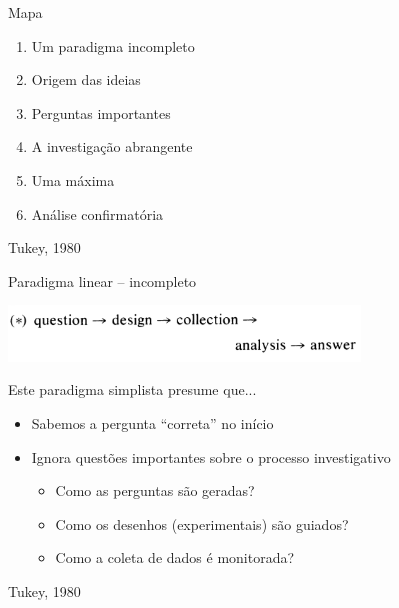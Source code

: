 \documentclass{beamer}
\begin{document}

\begin{frame}{Mapa}
  \begin{enumerate}
    \scriptsize
  \item Um paradigma incompleto
    \bigskip
  \item Origem das ideias
    \bigskip
  \item Perguntas importantes
    \bigskip
  \item A investigação abrangente
    \bigskip
  \item Uma máxima
    \bigskip
  \item Análise confirmatória
  \end{enumerate}

  \vfill
  \scriptsize
  \hfill Tukey, 1980
\end{frame}

\begin{frame}{Paradigma linear -- incompleto}
  \begin{center}
    \includegraphics[width=0.7\textwidth]{EDA/eda-tukey1}
  \end{center}
  \bigskip
  \begin{block}{\scriptsize Este paradigma simplista presume que...}
    \begin{itemize}
      \footnotesize
    \item Sabemos a pergunta ``correta'' no início
      \bigskip
    \item Ignora questões importantes sobre o processo investigativo
      \medskip
      \begin{itemize}
        \tiny
      \item<2> Como as perguntas são geradas?
        \medskip
      \item<2> Como os desenhos (experimentais) são guiados?
        \medskip
      \item<2> Como a coleta de dados é monitorada?
      \end{itemize}
    \end{itemize}
  \end{block}

  \vfill
  \scriptsize
  \hfill Tukey, 1980
\end{frame}
\end{document}
